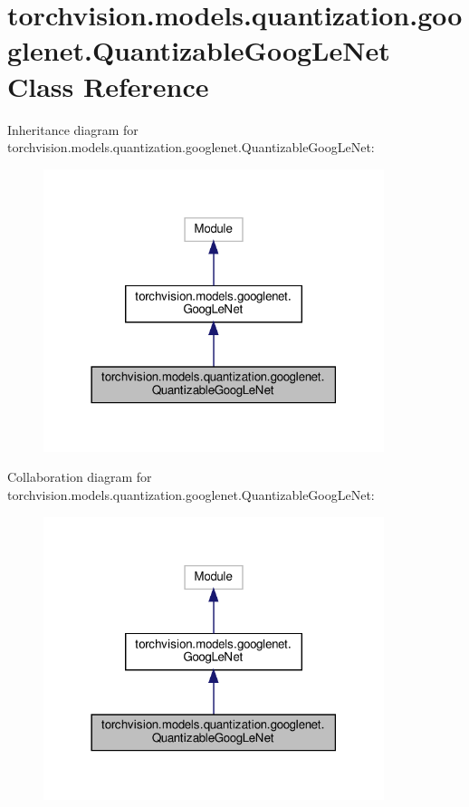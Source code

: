 \hypertarget{classtorchvision_1_1models_1_1quantization_1_1googlenet_1_1QuantizableGoogLeNet}{}\section{torchvision.\+models.\+quantization.\+googlenet.\+Quantizable\+Goog\+Le\+Net Class Reference}
\label{classtorchvision_1_1models_1_1quantization_1_1googlenet_1_1QuantizableGoogLeNet}


Inheritance diagram for torchvision.\+models.\+quantization.\+googlenet.\+Quantizable\+Goog\+Le\+Net\+:
\nopagebreak
\begin{figure}[H]
\begin{center}
\leavevmode
\includegraphics[width=282pt]{classtorchvision_1_1models_1_1quantization_1_1googlenet_1_1QuantizableGoogLeNet__inherit__graph}
\end{center}
\end{figure}


Collaboration diagram for torchvision.\+models.\+quantization.\+googlenet.\+Quantizable\+Goog\+Le\+Net\+:
\nopagebreak
\begin{figure}[H]
\begin{center}
\leavevmode
\includegraphics[width=282pt]{classtorchvision_1_1models_1_1quantization_1_1googlenet_1_1QuantizableGoogLeNet__coll__graph}
\end{center}
\end{figure}
